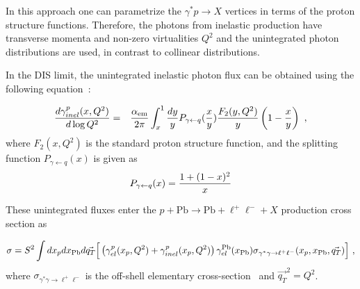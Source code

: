 In this approach one can parametrize the $\gamma^*p \rightarrow X$ vertices in terms of the proton structure functions. 
Therefore, the photons from inelastic production have transverse momenta and non-zero virtualities $Q^2$ and the unintegrated photon distributions are used, in contrast to collinear distributions.

In the DIS limit, the unintegrated inelastic photon flux can be obtained using the following equation~\cite{daSilveira:2014jla, Luszczak:2015aoa}:

\begin{eqnarray}
{d \gamma^p_{inel}(x,Q^2) \over d \log Q^2} =&& {\alpha_{\rm{em}} \over 2 \pi} \int_x^1 {dy \over y} 
P_{\gamma \leftarrow q}({x\over y}) 
{F_2(y, Q^2) \over y} \left(1- {x\over y}\right)~,
\end{eqnarray}
where $F_2(x, Q^2)$ is the standard proton structure function, and the splitting function $P_{\gamma \leftarrow q}(x)$ is given as
\begin{eqnarray}
P_{\gamma \leftarrow q}(x) = {1+(1-x)^2 \over x}
\end{eqnarray}


These unintegrated fluxes enter the $p+\textrm{Pb}\rightarrow \textrm{Pb} + \ell^+\ell^- + X$ production cross section as

\begin{equation}
\sigma = S^2 \int dx_p dx_{\rm Pb} d\vec{q_T} \Big[
\left ( \gamma^{p}_{el}(x_p, Q^2) + \gamma^{p}_{inel}(x_p,Q^2) \right)
 \gamma^{\rm Pb}_{el}(x_{\rm Pb})
\sigma_{\gamma^{*}  \gamma \rightarrow \ell^+ \ell^-}(x_p, x_{\rm Pb}, \vec{q_T})  \Big]~,
\label{kt_factorization_formula}
\end{equation}
%
where $\sigma_{\gamma^{*} \gamma \rightarrow \ell^+ \ell^-}$ is the off-shell elementary cross-section~\cite{daSilveira:2014jla} and $\vec{q_T}^2 = Q^2$.
